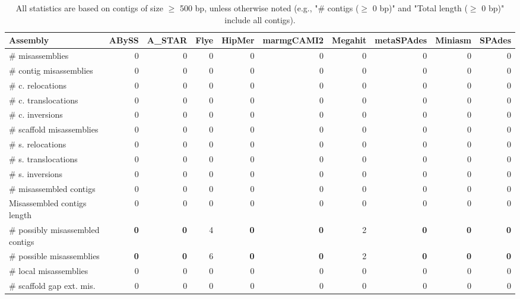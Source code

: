 \documentclass[12pt,a4paper]{article}
\begin{document}
\begin{table}[ht]
\begin{center}
\caption{All statistics are based on contigs of size $\geq$ 500 bp, unless otherwise noted (e.g., "\# contigs ($\geq$ 0 bp)" and "Total length ($\geq$ 0 bp)" include all contigs).}
\begin{tabular}{|l*{9}{|r}|}
\hline
Assembly & ABySS & A\_STAR & Flye & HipMer & marmgCAMI2 & Megahit & metaSPAdes & Miniasm & SPAdes \\ \hline
\# misassemblies & 0 & 0 & 0 & 0 & 0 & 0 & 0 & 0 & 0 \\ \hline
\hspace{2mm}\# contig misassemblies & 0 & 0 & 0 & 0 & 0 & 0 & 0 & 0 & 0 \\ \hline
\hspace{5mm}\# c. relocations & 0 & 0 & 0 & 0 & 0 & 0 & 0 & 0 & 0 \\ \hline
\hspace{5mm}\# c. translocations & 0 & 0 & 0 & 0 & 0 & 0 & 0 & 0 & 0 \\ \hline
\hspace{5mm}\# c. inversions & 0 & 0 & 0 & 0 & 0 & 0 & 0 & 0 & 0 \\ \hline
\hspace{2mm}\# scaffold misassemblies & 0 & 0 & 0 & 0 & 0 & 0 & 0 & 0 & 0 \\ \hline
\hspace{5mm}\# s. relocations & 0 & 0 & 0 & 0 & 0 & 0 & 0 & 0 & 0 \\ \hline
\hspace{5mm}\# s. translocations & 0 & 0 & 0 & 0 & 0 & 0 & 0 & 0 & 0 \\ \hline
\hspace{5mm}\# s. inversions & 0 & 0 & 0 & 0 & 0 & 0 & 0 & 0 & 0 \\ \hline
\# misassembled contigs & 0 & 0 & 0 & 0 & 0 & 0 & 0 & 0 & 0 \\ \hline
Misassembled contigs length & 0 & 0 & 0 & 0 & 0 & 0 & 0 & 0 & 0 \\ \hline
\# possibly misassembled contigs & {\bf 0} & {\bf 0} & 4 & {\bf 0} & {\bf 0} & 2 & {\bf 0} & {\bf 0} & {\bf 0} \\ \hline
\hspace{5mm}\# possible misassemblies & {\bf 0} & {\bf 0} & 6 & {\bf 0} & {\bf 0} & 2 & {\bf 0} & {\bf 0} & {\bf 0} \\ \hline
\# local misassemblies & 0 & 0 & 0 & 0 & 0 & 0 & 0 & 0 & 0 \\ \hline
\# scaffold gap ext. mis. & 0 & 0 & 0 & 0 & 0 & 0 & 0 & 0 & 0 \\ \hline

\end{tabular}
\end{center}
\end{table}
\end{document}
